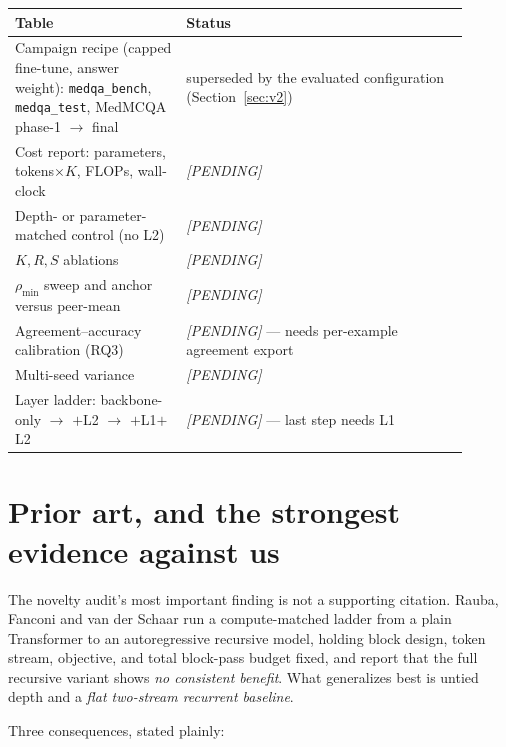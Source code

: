 \documentclass[11pt,a4paper]{article}
\newcommand{\rhodim}{\rho}
\theoremstyle{plain}
\theoremstyle{definition}
\theoremstyle{remark}
\begin{document}
\begin{center}
\small
\begin{tabular}{@{}>{\raggedright\arraybackslash}p{0.34\linewidth}>{\raggedright\arraybackslash}p{0.56\linewidth}@{}}
\toprule
\rowcolor{ekHeadBG}\color{white}\textbf{Table} & \color{white}\textbf{Status} \\
\midrule
\rowcolor{ekRowW}
Campaign recipe (capped fine-tune, answer weight): \texttt{medqa\_bench}, \texttt{medqa\_test}, MedMCQA phase-1 $\to$ final & superseded by the evaluated configuration (Section~\ref{sec:v2}) \\
Cost report: parameters, tokens$\times K$, FLOPs, wall-clock & \textit{[PENDING]} \\
Depth- or parameter-matched control (no L2) & \textit{[PENDING]} \\
$K, R, S$ ablations & \textit{[PENDING]} \\
$\rhodim_{\min}$ sweep and anchor versus peer-mean & \textit{[PENDING]} \\
Agreement--accuracy calibration (RQ3) & \textit{[PENDING]} --- needs per-example agreement export \\
Multi-seed variance & \textit{[PENDING]} \\
Layer ladder: backbone-only $\to$ $+$L2 $\to$ $+$L1$+$L2 & \textit{[PENDING]} --- last step needs L1 \\
\bottomrule
\end{tabular}
\end{center}

\section{Prior art, and the strongest evidence against us}
\label{sec:counter-evidence}

\noindent
The novelty audit's most important finding is not a supporting citation. Rauba,
Fanconi and van der Schaar \cite{rauba2026trm} run a compute-matched ladder
from a plain Transformer to an autoregressive recursive model, holding block
design, token stream, objective, and total block-pass budget fixed, and report
that the full recursive variant shows \emph{no consistent benefit}. What
generalizes best is untied depth and a \emph{flat two-stream recurrent
baseline}.

\noindent
Three consequences, stated plainly:
\end{document}
